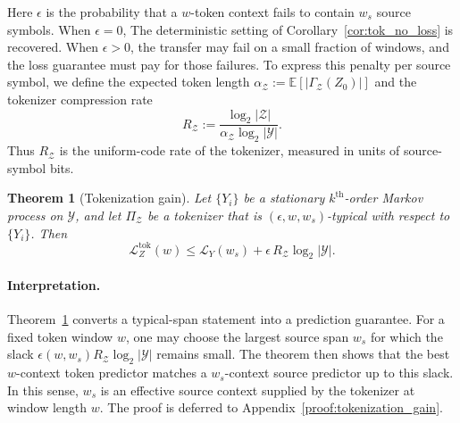 \documentclass{article}
\theoremstyle{plain}
\newtheorem{theorem}{Theorem}[section]
\theoremstyle{definition}
\theoremstyle{remark}
\begin{document}
    Here $\epsilon$ is the probability that a $w$-token context fails to contain
    $w_s$ source symbols. When $\epsilon=0$, The deterministic setting of
    Corollary~\ref{cor:tok_no_loss} is recovered. When $\epsilon>0$, the transfer may fail on a
    small fraction of windows, and the loss guarantee must pay for those failures.
    To express this penalty per source symbol, we define the expected token length
    $
        \alpha_{\mathcal{Z}}
        :=
        \mathbb{E}\!\left[
            |\Gamma_{\mathcal{Z}}(Z_0)|
        \right]
    $
    and the
    tokenizer compression rate
    \[
        R_{\mathcal{Z}}
        :=
        \frac{\log_2 |\mathcal{Z}|}
        {\alpha_{\mathcal{Z}}\log_2|\mathcal{Y}|}.
    \]
    Thus $R_{\mathcal{Z}}$ is the uniform-code rate of the tokenizer, measured in units of source-symbol bits.
    
    \begin{mainthmbox}
    \begin{theorem}[Tokenization gain]\label{thm:tokenization_gain}
    Let $\{Y_i\}$ be a stationary $k^{\text{th}}$-order Markov process on
    $\mathcal{Y}$, and let $\Pi_{\mathcal{Z}}$ be a tokenizer that is
    $(\epsilon,w,w_s)$-typical with respect to $\{Y_i\}$. Then
    \[
        \mathcal{L}_Z^{\mathrm{tok}}(w)
        \le
        \mathcal{L}_Y(w_s)
        +
        \epsilon\,R_{\mathcal{Z}}\log_2|\mathcal{Y}|.
    \]
    \end{theorem}
    \end{mainthmbox}
    \paragraph{Interpretation.}
Theorem~\ref{thm:tokenization_gain} converts a typical-span statement into a
prediction guarantee.  For a fixed token window $w$, one may choose the
largest source span $w_s$ for which the slack $\epsilon(w,w_s)R_{\mathcal Z}\log_2|\mathcal Y|$
remains small.  The theorem then shows that the best $w$-context token
predictor matches a $w_s$-context source predictor up to this slack.  In this
sense, $w_s$ is an effective source context supplied by the tokenizer at
window length $w$.  The proof is deferred to
Appendix~\ref{proof:tokenization_gain}.
    
\end{document}
